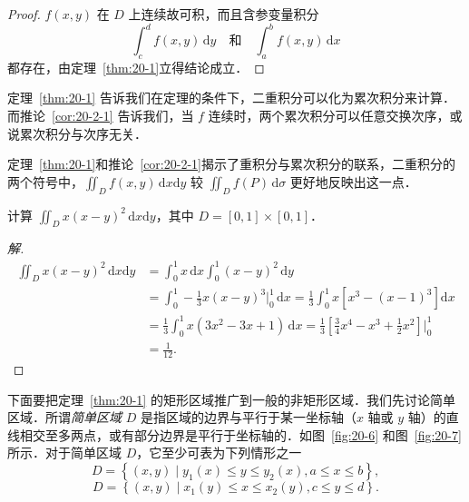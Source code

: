 \begin{proof}
$f(x,y)$ 在 $D$ 上连续故可积，而且含参变量积分
\[
\int_{c}^{d}f(x,y)\,\mathrm{d}y\quad\text{和}\quad\int_{a}^{b}f(x,y)\,\mathrm{d}x
\]
都存在，由定理~\ref{thm:20-1}立得结论成立．
\end{proof}

定理~\ref{thm:20-1} 告诉我们在定理的条件下，二重积分可以化为累次积分来计算．而推论~\ref{cor:20-2-1} 告诉我们，当 $f$ 连续时，两个累次积分可以任意交换次序，或说累次积分与次序无关．

定理~\ref{thm:20-1}和推论~\ref{cor:20-2-1}揭示了重积分与累次积分的联系，二重积分的两个符号中，$\displaystyle\iint_{D}f(x,y)\,\mathrm{d}x\mathrm{d}y$ 较 $\displaystyle\iint_{D}f(P)\,\mathrm{d}\sigma$ 更好地反映出这一点．

\begin{example}\label{ex:20-2-1}
计算 $\displaystyle\iint_{D}x(x-y)^{2}\,\mathrm{d}x\mathrm{d}y$，其中 $D=[0,1]\times[0,1]$．
\end{example}

\begin{proof}[解]
\[
\begin{aligned}
\iint_{D}x(x-y)^{2}\,\mathrm{d}x\mathrm{d}y&=\int_{0}^{1}x\,\mathrm{d}x\int_{0}^{1}(x-y)^{2}\,\mathrm{d}y\\
&=\int_{0}^{1}-\frac{1}{3}x(x-y)^{3}\bigg|_{0}^{1}\,\mathrm{d}x=\frac{1}{3}\int_{0}^{1}x\left[x^{3}-(x-1)^{3}\right]\mathrm{d}x\\
&=\frac{1}{3}\int_{0}^{1}x(3x^{2}-3x+1)\,\mathrm{d}x=\frac{1}{3}\left[\frac{3}{4}x^{4}-x^{3}+\frac{1}{2}x^{2}\right]\bigg|_{0}^{1}\\
&=\frac{1}{12}.
\end{aligned}
\]
\end{proof}

下面要把定理~\ref{thm:20-1} 的矩形区域推广到一般的非矩形区域．我们先讨论简单区域．所谓\emph{简单区域} $D$ 是指区域的边界与平行于某一坐标轴（$x$ 轴或 $y$ 轴）的直线相交至多两点，或有部分边界是平行于坐标轴的．如图~\ref{fig:20-6} 和图~\ref{fig:20-7} 所示．对于简单区域 $D$，它至少可表为下列情形之一
\begin{equation}\label{eq:20-2-1}
D=\left\{(x,y)\mid y_{1}(x)\leqslant y\leqslant y_{2}(x),a\leqslant x\leqslant b\right\},
\tag{1}
\end{equation}
\begin{equation}\label{eq:20-2-2}
D=\left\{(x,y)\mid x_{1}(y)\leqslant x\leqslant x_{2}(y),c\leqslant y\leqslant d\right\}.
\tag{2}
\end{equation}

